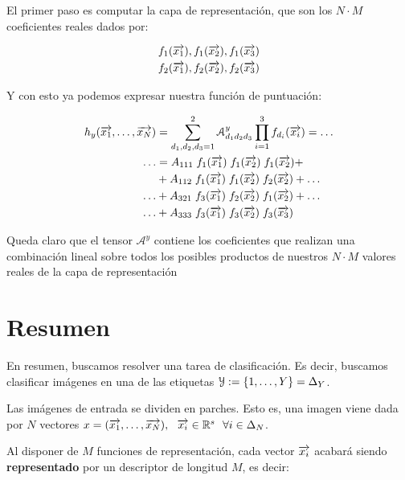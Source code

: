 El primer paso es computar la capa de representación, que son los $N \cdot M$ coeficientes reales dados por:

\begin{equation}
	\begin{split}
		f_1(\overrightarrow{x_1}), f_1(\overrightarrow{x_2}), f_1(\overrightarrow{x_3}) \\
		f_2(\overrightarrow{x_1}), f_2(\overrightarrow{x_2}), f_2(\overrightarrow{x_3})
	\end{split}
\end{equation}

Y con esto ya podemos expresar nuestra función de puntuación:

\begin{equation}
	\begin{split}
		h_y(\overrightarrow{x_1}, \ldots, \overrightarrow{x_N}) &= \sum_{d_1, d_2, d_3 = 1}^{2} \mathcal{A}^y_{d_1 d_2 d_3} \prod_{i = 1}^3 f_{d_i}(\overrightarrow{x_i}) = \ldots \\
		\ldots &= A_{111} \; f_1(\overrightarrow{x_1}) \; f_1(\overrightarrow{x_2}) \; f_1(\overrightarrow{x_2}) + \\
		&+ A_{112} \; f_1(\overrightarrow{x_1}) \; f_1(\overrightarrow{x_2}) \; f_2(\overrightarrow{x_2}) + \ldots \\
		\ldots &+ A_{321} \; f_3(\overrightarrow{x_1}) \; f_2(\overrightarrow{x_2}) \; f_1(\overrightarrow{x_2}) + \ldots \\
		\ldots &+ A_{333} \; f_3(\overrightarrow{x_1}) \; f_3(\overrightarrow{x_2}) \; f_3(\overrightarrow{x_3})
	\end{split}
\end{equation}

Queda claro que el tensor $\mathcal{A}^y$ contiene los coeficientes que realizan una combinación lineal sobre todos los posibles productos de nuestros $N \cdot M$ valores reales de la capa de representación

\section{Resumen}

En resumen, buscamos resolver una tarea de clasificación. Es decir, buscamos clasificar imágenes en una de las etiquetas $\mathcal{Y} := \{1, \ldots, Y\} = \Delta_{Y}$.

Las imágenes de entrada se dividen en parches. Esto es, una imagen viene dada por $N$ vectores $x = (\overrightarrow{x_1}, \ldots, \overrightarrow{x_N}), \ \  \overrightarrow{x_i} \in \mathbb{R}^s \ \  \forall i \in \Delta_{N}$.

Al disponer de $M$ funciones de representación, cada vector $\overrightarrow{x_i}$ acabará siendo \textbf{representado} por un descriptor de longitud $M$, es decir:

